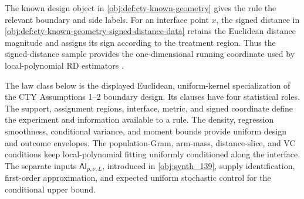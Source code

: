 \documentclass[11pt]{article}
\begin{document}
The known design object  in \cref{obj:def:cty-known-geometry} gives the rule the relevant boundary and side labels. For an interface point \(x\), the signed distance  in \cref{obj:def:cty-known-geometry-signed-distance-data} retains the Euclidean distance magnitude and assigns its sign according to the treatment region. Thus the signed-distance sample  provides the one-dimensional running coordinate used by local-polynomial RD estimators \citep{Fan1996,Ruppert1994,Calonico2014,Calonico2020,Imbens2019}.

The law class below is the displayed Euclidean, uniform-kernel specialization of the CTY Assumptions 1--2 boundary design. Its clauses have four statistical roles. The support, assignment regions, interface, metric, and signed coordinate define the experiment and information available to a rule. The density, regression smoothness, conditional variance, and moment bounds provide uniform design and outcome envelopes. The population-Gram, arm-mass, distance-slice, and VC conditions keep local-polynomial fitting uniformly conditioned along the interface. The separate inputs \(\mathsf{AI}_{p,\nu,L}\), introduced in \cref{obj:synth_139}, supply identification, first-order approximation, and expected uniform stochastic control for the conditional upper bound.
\end{document}
